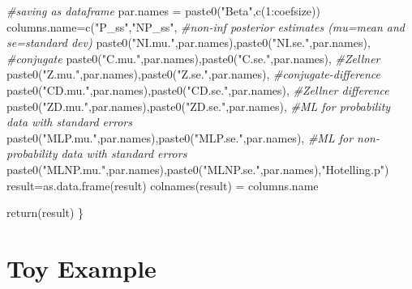 \documentclass[
]{article}
\newenvironment{Shaded}{\begin{snugshade}}{\end{snugshade}}
\newcommand{\CommentTok}[1]{\textcolor[rgb]{0.56,0.35,0.01}{\textit{#1}}}
\newcommand{\DecValTok}[1]{\textcolor[rgb]{0.00,0.00,0.81}{#1}}
\newcommand{\FunctionTok}[1]{\textcolor[rgb]{0.00,0.00,0.00}{#1}}
\newcommand{\NormalTok}[1]{#1}
\newcommand{\OtherTok}[1]{\textcolor[rgb]{0.56,0.35,0.01}{#1}}
\newcommand{\SpecialCharTok}[1]{\textcolor[rgb]{0.00,0.00,0.00}{#1}}
\newcommand{\StringTok}[1]{\textcolor[rgb]{0.31,0.60,0.02}{#1}}
\begin{document}
\begin{Shaded}
\begin{Highlighting}[]
  \CommentTok{\#saving as dataframe}
\NormalTok{  par.names }\OtherTok{=} \FunctionTok{paste0}\NormalTok{(}\StringTok{"Beta"}\NormalTok{,}\FunctionTok{c}\NormalTok{(}\DecValTok{1}\SpecialCharTok{:}\NormalTok{coefsize)) }
\NormalTok{  columns.name}\OtherTok{=}\FunctionTok{c}\NormalTok{(}\StringTok{"P\_ss"}\NormalTok{,}\StringTok{"NP\_ss"}\NormalTok{,}
                 \CommentTok{\#non{-}inf posterior estimates (mu=mean and se=standard dev)}
                 \FunctionTok{paste0}\NormalTok{(}\StringTok{"NI.mu."}\NormalTok{,par.names),}\FunctionTok{paste0}\NormalTok{(}\StringTok{"NI.se."}\NormalTok{,par.names),}
                 \CommentTok{\#conjugate}
                 \FunctionTok{paste0}\NormalTok{(}\StringTok{"C.mu."}\NormalTok{,par.names),}\FunctionTok{paste0}\NormalTok{(}\StringTok{"C.se."}\NormalTok{,par.names),}
                 \CommentTok{\#Zellner}
                 \FunctionTok{paste0}\NormalTok{(}\StringTok{"Z.mu."}\NormalTok{,par.names),}\FunctionTok{paste0}\NormalTok{(}\StringTok{"Z.se."}\NormalTok{,par.names),}
                 \CommentTok{\#conjugate{-}difference}
                 \FunctionTok{paste0}\NormalTok{(}\StringTok{"CD.mu."}\NormalTok{,par.names),}\FunctionTok{paste0}\NormalTok{(}\StringTok{"CD.se."}\NormalTok{,par.names),}
                 \CommentTok{\#Zellner difference}
                 \FunctionTok{paste0}\NormalTok{(}\StringTok{"ZD.mu."}\NormalTok{,par.names),}\FunctionTok{paste0}\NormalTok{(}\StringTok{"ZD.se."}\NormalTok{,par.names),}
                 \CommentTok{\#ML for probability data with standard errors}
                 \FunctionTok{paste0}\NormalTok{(}\StringTok{"MLP.mu."}\NormalTok{,par.names),}\FunctionTok{paste0}\NormalTok{(}\StringTok{"MLP.se."}\NormalTok{,par.names),}
                 \CommentTok{\#ML for non{-}probability data with standard errors}
                 \FunctionTok{paste0}\NormalTok{(}\StringTok{"MLNP.mu."}\NormalTok{,par.names),}\FunctionTok{paste0}\NormalTok{(}\StringTok{"MLNP.se."}\NormalTok{,par.names),}\StringTok{"Hotelling.p"}\NormalTok{)}
\NormalTok{  result}\OtherTok{=}\FunctionTok{as.data.frame}\NormalTok{(result)}
  \FunctionTok{colnames}\NormalTok{(result) }\OtherTok{=}\NormalTok{ columns.name}
  
  \FunctionTok{return}\NormalTok{(result)}
\NormalTok{\}}
\end{Highlighting}
\end{Shaded}

\hypertarget{toy-example}{%
\section{Toy Example}\label{toy-example}}
\end{document}

